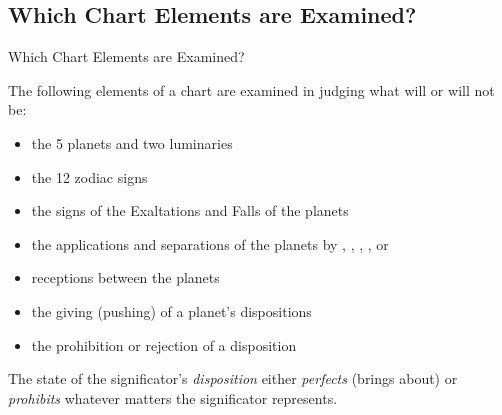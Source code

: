 \subsection{Which Chart Elements are Examined?}
\begin{frame}[t]{Which Chart Elements are Examined?}

The following elements of a chart are examined in judging what will or will not be:
\begin{itemize}
\item the 5 planets and two luminaries
\item the 12 zodiac signs
\item the signs of  the Exaltations and Falls of the planets
\item the applications and separations of the planets by \Conjunction, \Sextile, \Square, \Trine, or \Opposition\ 
\item receptions between the planets
\item the giving (pushing) of a planet's dispositions
\item the prohibition or rejection of a disposition
\end{itemize}
\vspace{0.5cm}

The state of the significator's \textsl{disposition} either \textsl{perfects} (brings about) or \textsl{prohibits} whatever matters the significator represents.
\end{frame}
